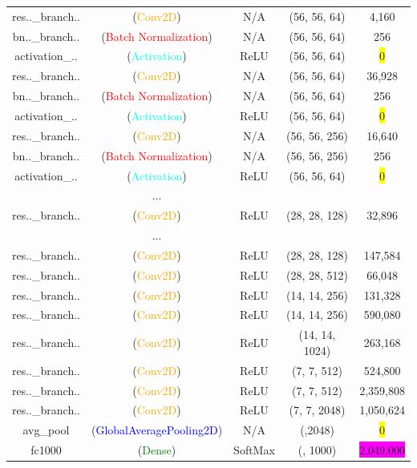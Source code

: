 \begin{frame}
\begin{center}
{\begin{tabular}{ccccc}
			res..\_branch.. & (\textcolor{orange}{Conv2D}) & N/A & (56, 56, 64) &  4,160 \\ 
			bn..\_branch..  & (\textcolor{red}{Batch Normalization}) & N/A & (56, 56, 64) & 256 \\ 
			activation\_.. & (\textcolor{cyan}{Activation}) & ReLU & (56, 56, 64) & \colorbox{yellow}{0} \\
			res..\_branch.. & (\textcolor{orange}{Conv2D}) & N/A & (56, 56, 64) & 36,928 \\ 
			bn..\_branch..  & (\textcolor{red}{Batch Normalization}) & N/A & (56, 56, 64) & 256 \\          
			activation\_.. & (\textcolor{cyan}{Activation}) & ReLU & (56, 56, 64) & \colorbox{yellow}{0} \\
			res..\_branch.. & (\textcolor{orange}{Conv2D}) & N/A & (56, 56, 256) & 16,640 \\ 
			bn..\_branch..  & (\textcolor{red}{Batch Normalization}) & N/A & (56, 56, 256) & 256 \\ 
			activation\_.. & (\textcolor{cyan}{Activation}) & ReLU & (56, 56, 64) & \colorbox{yellow}{0} \\
			& ... & & &\\
			res..\_branch.. & (\textcolor{orange}{Conv2D}) & ReLU & (28, 28, 128) & 32,896 \\ 
			& ... & & &\\   
			res..\_branch.. & (\textcolor{orange}{Conv2D}) & ReLU & (28, 28, 128) & 147,584 \\         
			res..\_branch.. & (\textcolor{orange}{Conv2D}) & ReLU & (28, 28, 512) & 66,048 \\   
			
			res..\_branch.. & (\textcolor{orange}{Conv2D}) & ReLU & (14, 14, 256) & 131,328 \\   
			res..\_branch.. & (\textcolor{orange}{Conv2D}) & ReLU & (14, 14, 256) &  590,080  \\         
			res..\_branch.. & (\textcolor{orange}{Conv2D}) & ReLU & (14, 14, 1024) & 263,168 \\  
			
			res..\_branch.. & (\textcolor{orange}{Conv2D}) & ReLU & (7, 7, 512) & 524,800 \\   
			res..\_branch.. & (\textcolor{orange}{Conv2D}) & ReLU & (7, 7, 512) & 2,359,808 \\   
			res..\_branch.. & (\textcolor{orange}{Conv2D}) & ReLU & (7, 7, 2048) & 1,050,624 \\
			
			
			avg\_pool & (\textcolor{blue}{GlobalAveragePooling2D}) & N/A & (,2048) & \colorbox{yellow}{0} \\         
			fc1000 & (\textcolor{green}{Dense}) & SoftMax & (, 1000) & \colorbox{magenta}{2,049,000} \\ 
			
		\end{tabular}
	}
\end{center}
\end{frame}





